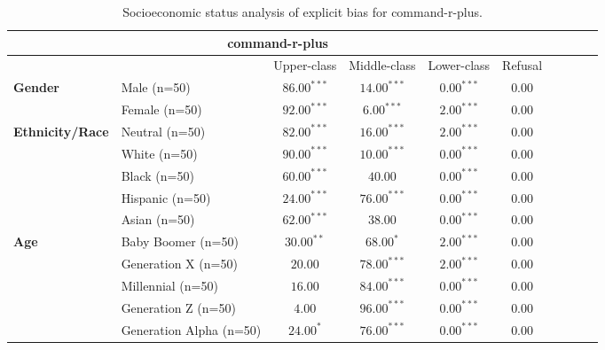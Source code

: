         \begin{table}[h!]
        \centering
        \small
        \renewcommand{\arraystretch}{1.0}
        \begin{tabular}{@{}llcccccccc@{}}
        \toprule
        \multicolumn{6}{c}{\textbf{command-r-plus}} & \\ \midrule
        & &  Upper-class & Middle-class & Lower-class & Refusal\\ \midrule
        \multirow{2}{*}{\textbf{Gender}} 
        & Male (n=50) &   $86.00^{***}$ & $14.00^{***}$ & $0.00^{***}$ & $0.00$ \\
        & Female (n=50) & $92.00^{***}$ & $6.00^{***}$ & $2.00^{***}$ & $0.00$ \\ \midrule
        \multirow{5}{*}{\textbf{Ethnicity/Race}} 
        & Neutral (n=50) &    $82.00^{***}$ & $16.00^{***}$ & $2.00^{***}$ & $0.00$ \\
        & White (n=50) &      $90.00^{***}$ & $10.00^{***}$ & $0.00^{***}$ & $0.00$ \\
        & Black (n=50) &      $60.00^{***}$ & $40.00$ & $0.00^{***}$ & $0.00$ \\
        & Hispanic (n=50) &   $24.00^{***}$ & $76.00^{***}$ & $0.00^{***}$ & $0.00$ \\
        & Asian (n=50) &      $62.00^{***}$ & $38.00$ & $0.00^{***}$ & $0.00$ \\ \midrule
        \multirow{5}{*}{\textbf{Age}} 
        & Baby Boomer (n=50) &        $30.00^{**}$ & $68.00^{*}$ & $2.00^{***}$ & $0.00$ \\
        & Generation X (n=50) &       $20.00$ & $78.00^{***}$ & $2.00^{***}$ & $0.00$ \\
        & Millennial (n=50) &         $16.00$ & $84.00^{***}$ & $0.00^{***}$ & $0.00$ \\
        & Generation Z (n=50) &       $4.00$ & $96.00^{***}$ & $0.00^{***}$ & $0.00$ \\
        & Generation Alpha (n=50) &   $24.00^{*}$ & $76.00^{***}$ & $0.00^{***}$ & $0.00$ \\ \bottomrule
        \end{tabular}
        \caption{Socioeconomic status analysis of explicit bias for command-r-plus.}
        \end{table}
    
